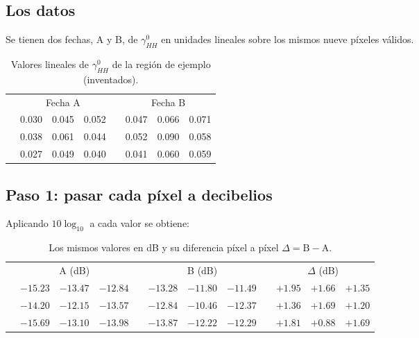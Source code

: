 \documentclass[11pt,a4paper]{article}
\begin{document}
\subsection{Los datos}

Se tienen dos fechas, A y B, de $\gamma^0_{HH}$ en unidades lineales sobre los mismos nueve píxeles válidos.

\begin{table}[htbp]
\centering
\caption{Valores lineales de $\gamma^0_{HH}$ de la región de ejemplo (inventados).}
\label{tab:mano-lineal}
\small
\begin{tabular}{@{}c ccc c ccc@{}}
\toprule
 & \multicolumn{3}{c}{Fecha A} & & \multicolumn{3}{c}{Fecha B} \\
\cmidrule(lr){2-4}\cmidrule(lr){6-8}
 & 0.030 & 0.045 & 0.052 & & 0.047 & 0.066 & 0.071 \\
 & 0.038 & 0.061 & 0.044 & & 0.052 & 0.090 & 0.058 \\
 & 0.027 & 0.049 & 0.040 & & 0.041 & 0.060 & 0.059 \\
\bottomrule
\end{tabular}
\end{table}

\subsection{Paso 1: pasar cada píxel a decibelios}

Aplicando $10\log_{10}$ a cada valor se obtiene:

\begin{table}[htbp]
\centering
\caption{Los mismos valores en dB y su diferencia píxel a píxel $\Delta=\mathrm{B}-\mathrm{A}$.}
\label{tab:mano-db}
\small
\begin{tabular}{@{}c ccc c ccc c ccc@{}}
\toprule
 & \multicolumn{3}{c}{A (dB)} & & \multicolumn{3}{c}{B (dB)} & & \multicolumn{3}{c}{$\Delta$ (dB)} \\
\cmidrule(lr){2-4}\cmidrule(lr){6-8}\cmidrule(lr){10-12}
 & $-15.23$ & $-13.47$ & $-12.84$ & & $-13.28$ & $-11.80$ & $-11.49$ & & $+1.95$ & $+1.66$ & $+1.35$ \\
 & $-14.20$ & $-12.15$ & $-13.57$ & & $-12.84$ & $-10.46$ & $-12.37$ & & $+1.36$ & $+1.69$ & $+1.20$ \\
 & $-15.69$ & $-13.10$ & $-13.98$ & & $-13.87$ & $-12.22$ & $-12.29$ & & $+1.81$ & $+0.88$ & $+1.69$ \\
\bottomrule
\end{tabular}
\end{table}
\end{document}
